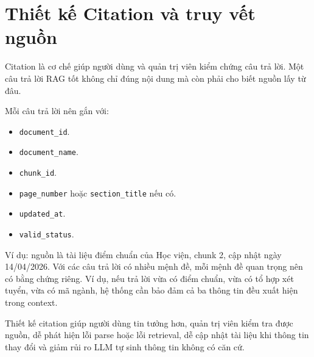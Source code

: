 \section{Thiết kế Citation và truy vết nguồn}

Citation là cơ chế giúp người dùng và quản trị viên kiểm chứng câu trả lời. Một câu trả lời RAG tốt không chỉ đúng nội dung mà còn phải cho biết nguồn lấy từ đâu.

Mỗi câu trả lời nên gắn với:

\begin{itemize}
    \item \texttt{document\_id}.
    \item \texttt{document\_name}.
    \item \texttt{chunk\_id}.
    \item \texttt{page\_number} hoặc \texttt{section\_title} nếu có.
    \item \texttt{updated\_at}.
    \item \texttt{valid\_status}.
\end{itemize}

Ví dụ: nguồn là tài liệu điểm chuẩn của Học viện, chunk 2, cập nhật ngày 14/04/2026. Với các câu trả lời có nhiều mệnh đề, mỗi mệnh đề quan trọng nên có bằng chứng riêng. Ví dụ, nếu trả lời vừa có điểm chuẩn, vừa có tổ hợp xét tuyển, vừa có mã ngành, hệ thống cần bảo đảm cả ba thông tin đều xuất hiện trong context.

Thiết kế citation giúp người dùng tin tưởng hơn, quản trị viên kiểm tra được nguồn, dễ phát hiện lỗi parse hoặc lỗi retrieval, dễ cập nhật tài liệu khi thông tin thay đổi và giảm rủi ro LLM tự sinh thông tin không có căn cứ.
